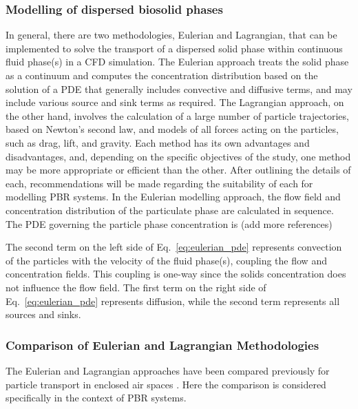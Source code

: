 \subsubsection{Modelling of dispersed biosolid phases}
\label{S:21}
In general, there are two methodologies, Eulerian and Lagrangian, that can be implemented to solve the transport of a dispersed solid phase within continuous fluid phase(s) in a CFD simulation. The Eulerian approach treats the solid phase as a continuum and computes the concentration distribution based on the solution of a PDE that generally includes convective and diffusive terms, and may include various source and sink terms as required.  The Lagrangian approach, on the other hand, involves the calculation of a large number of particle trajectories, based on Newton's second law, and models of all forces acting on the particles, such as drag, lift, and gravity. Each method has its own advantages and disadvantages, and, depending on the specific objectives of the study, one method may be more appropriate or efficient than the other.  After outlining the details of each, recommendations will be made regarding the suitability of each for modelling PBR systems.
\skippingparagraph
In the Eulerian modelling approach, the flow field and concentration distribution of the particulate phase are calculated in sequence.  The PDE governing the particle phase concentration is \cite{zhang2007} (add more references)



The second term on the left side of Eq.\ \ref{eq:eulerian_pde} represents convection of the particles with the velocity of the fluid phase(s), coupling the flow and concentration fields.  This coupling is one-way since the solids concentration does not influence the flow field.  The first term on the right side of Eq.\ \ref{eq:eulerian_pde} represents diffusion, while the second term represents all sources and sinks.

%


\subsubsection{Comparison of Eulerian and Lagrangian Methodologies}

The Eulerian and Lagrangian approaches have been compared previously for particle transport in enclosed air spaces \cite{zhang2007}. Here the comparison is considered specifically in the context of PBR systems.

